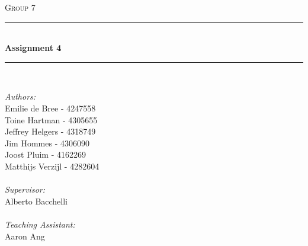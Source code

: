 \begin{titlepage}

\newcommand{\HRule}{\rule{\linewidth}{0.5mm}} %

\center %
 

\textsc{\LARGE Group 7}\\[1.5cm] %


\HRule \\[0.4cm]
{ \huge \bfseries Assignment 4}\\[0.4cm] %
\HRule \\[4cm]
 

\begin{minipage}{0.5\textwidth}
\emph{Authors:}\\     
Emilie de Bree - 4247558\\
Toine Hartman - 4305655\\
Jeffrey Helgers - 4318749 \\
Jim Hommes - 4306090\\
Joost Pluim - 4162269 \\
Matthijs Verzijl - 4282604\\\\
\emph{Supervisor:} \\
Alberto Bacchelli \\\\
\emph{Teaching Assistant:} \\
Aaron Ang\\
\end{minipage}\\[4cm]




\end{titlepage}
